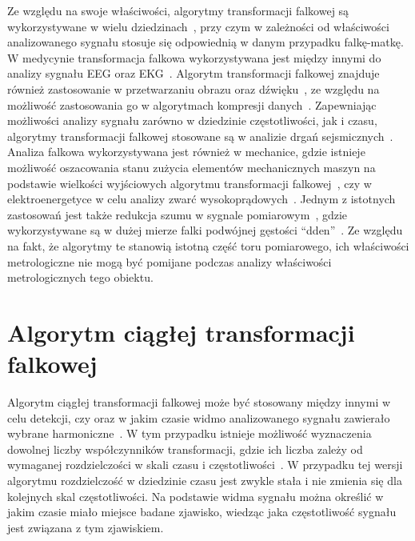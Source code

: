Ze względu na swoje właściwości, algorytmy transformacji falkowej są wykorzystywane w wielu dziedzinach~\cite{akujuobi_applications}, przy czym w zależności od właściwości analizowanego sygnału stosuje się odpowiednią w danym przypadku falkę-matkę. W medycynie transformacja falkowa wykorzystywana jest między innymi do analizy sygnału EEG oraz EKG~\cite{ocak_medicine, unser_medicine}. Algorytm transformacji falkowej znajduje również zastosowanie w przetwarzaniu obrazu oraz dźwięku~\cite{kotteri_imagecomp}, ze względu na możliwość zastosowania go w algorytmach kompresji danych~\cite{reddy_compression}. Zapewniając możliwości analizy sygnału zarówno w dziedzinie częstotliwości, jak i czasu, algorytmy transformacji falkowej stosowane są w analizie drgań sejsmicznych~\cite{anping_seismic}. Analiza falkowa wykorzystywana jest również w mechanice, gdzie istnieje możliwość oszacowania stanu zużycia elementów mechanicznych maszyn na podstawie wielkości wyjściowych algorytmu transformacji falkowej~\cite{yan_mechanics}, czy w elektroenergetyce w celu analizy zwarć wysokoprądowych~\cite{niedopytalski_zwar}. Jednym z istotnych zastosowań jest także redukcja szumu w sygnale pomiarowym~\cite{auth_denoise}, gdzie wykorzystywane są w dużej mierze falki podwójnej gęstości \enquote{dden}~\cite{vimala_ddendenoise}. Ze względu na fakt, że algorytmy te stanowią istotną część toru pomiarowego, ich właściwości metrologiczne nie mogą być pomijane podczas analizy właściwości metrologicznych tego obiektu.

\section{Algorytm ciągłej transformacji falkowej}

Algorytm ciągłej transformacji falkowej może być stosowany między innymi w celu detekcji, czy oraz w jakim czasie widmo analizowanego sygnału zawierało wybrane harmoniczne~\cite{anping_seismic}. W tym przypadku istnieje możliwość wyznaczenia dowolnej liczby współczynników transformacji, gdzie ich liczba zależy od wymaganej rozdzielczości w skali czasu i częstotliwości~\cite{wallen_handbook}. W przypadku tej wersji algorytmu rozdzielczość w dziedzinie czasu jest zwykle stała i nie zmienia się dla kolejnych skal częstotliwości. Na podstawie widma sygnału można określić w jakim czasie miało miejsce badane zjawisko, wiedząc jaka częstotliwość sygnału jest związana z tym zjawiskiem.

